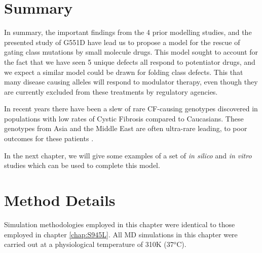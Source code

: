 \section{Summary}
In summary, the important findings from the 4 prior modelling studies, and the presented study of G551D have lead us to propose a model for the rescue of gating class mutations by small molecule drugs. This model sought to account for the fact that we have seen 5 unique defects all respond to potentiator drugs, and we expect a similar model could be drawn for folding class defects. This that many disease causing alleles will respond to modulator therapy, even though they are currently excluded from these treatments by regulatory agencies. 

In recent years there have been a slew of rare CF-causing genotypes discovered in populations with low rates of Cystic Fibrosis compared to Caucasians. These genotypes from Asia and the Middle East are often ultra-rare leading, to poor outcomes for these patients \cite{}. 

In the next chapter, we will give some examples of a set of \textit{in silico} and \textit{in vitro} studies which can be used to complete this model.

\section{Method Details}
Simulation methodologies employed in this chapter were identical to those employed in chapter \ref{chap:S945L}. All MD simulations in this chapter were carried out at a physiological temperature of 310K (37$^o$C).
